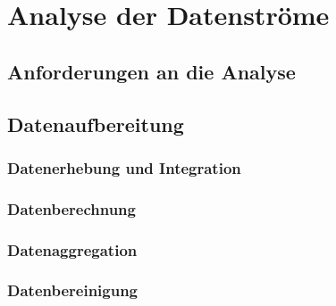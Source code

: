 

\chapter{Analyse der Datenströme}

\section{Anforderungen an die Analyse}

\section{Datenaufbereitung}

\subsection{Datenerhebung und Integration}

\subsection{Datenberechnung}

\subsection{Datenaggregation}

\subsection{Datenbereinigung}
